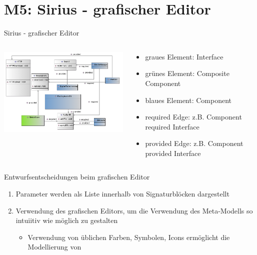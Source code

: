 \section[M5: Sirius]{M5: Sirius - grafischer Editor}
\begin{frame}{Sirius - grafischer Editor}
	\vspace{-5mm}
	\begin{columns}
		\begin{contentblock}{}
			\includegraphics[width=86mm]{figures/sirius.png}
		\end{contentblock}
		\begin{contentblock}{}
			\begin{itemize}
				\item graues Element: Interface
				\item grünes Element: Composite Component
				\item blaues Element: Component
				\item required Edge: z.B. Component required Interface 
				\item provided Edge: z.B. Component provided Interface
			\end{itemize}
		\end{contentblock}
	\end{columns}
\end{frame}

\begin{frame}{Entwurfsentscheidungen beim grafischen Editor}
	\begin{enumerate}
		\item Parameter werden als Liste innerhalb von Signaturblöcken dargestellt
		\item Verwendung des grafischen Editors, um die Verwendung des Meta-Modells so intuiitiv wie möglich zu gestalten
		\begin{itemize}
			\item Verwendung von üblichen Farben, Symbolen, Icons ermöglicht die Modellierung von 
		\end{itemize}
	\end{enumerate}
\end{frame}

